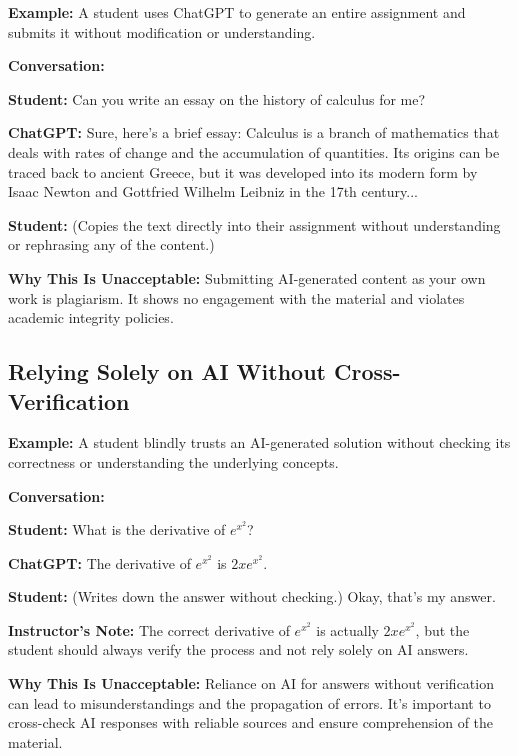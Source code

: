 \documentclass{article}
\begin{document}
\textbf{Example:} A student uses ChatGPT to generate an entire assignment and submits it without modification or understanding.

\textbf{Conversation:}
\begin{mdframed}
\begin{flushleft}
\textbf{Student:} Can you write an essay on the history of calculus for me?

\textbf{ChatGPT:} Sure, here’s a brief essay:
Calculus is a branch of mathematics that deals with rates of change and the accumulation of quantities. Its origins can be traced back to ancient Greece, but it was developed into its modern form by Isaac Newton and Gottfried Wilhelm Leibniz in the 17th century...

\textbf{Student:} (Copies the text directly into their assignment without understanding or rephrasing any of the content.)
\end{flushleft}
\end{mdframed}

\textbf{Why This Is Unacceptable:} Submitting AI-generated content as your own work is plagiarism. It shows no engagement with the material and violates academic integrity policies.

\subsection{Relying Solely on AI Without Cross-Verification}

\textbf{Example:} A student blindly trusts an AI-generated solution without checking its correctness or understanding the underlying concepts.

\textbf{Conversation:}
\begin{mdframed}
\begin{flushleft}
\textbf{Student:} What is the derivative of \(e^{x^2}\)?

\textbf{ChatGPT:} The derivative of \(e^{x^2}\) is \(2xe^{x^2}\).

\textbf{Student:} (Writes down the answer without checking.) Okay, that’s my answer.

\textbf{Instructor’s Note:} The correct derivative of \(e^{x^2}\) is actually \(2xe^{x^2}\), but the student should always verify the process and not rely solely on AI answers.
\end{flushleft}
\end{mdframed}

\textbf{Why This Is Unacceptable:} Reliance on AI for answers without verification can lead to misunderstandings and the propagation of errors. It's important to cross-check AI responses with reliable sources and ensure comprehension of the material.
\end{document}
